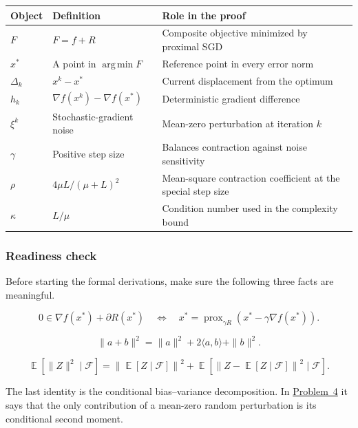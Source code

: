 \documentclass[11pt,a4paper]{article}
\DeclareMathOperator*{\argmin}{arg\,min}
\DeclareMathOperator{\E}{\mathbb{E}}
\DeclareMathOperator{\prox}{prox}
\newcommand{\jump}[2]{\hyperref[#1]{#2}}
\theoremstyle{definition}
\begin{document}
{\footnotesize
\setlength{\tabcolsep}{3pt}
\renewcommand{\arraystretch}{1.2}
\noindent
\begin{tabularx}{\linewidth}{|
  >{\raggedright\arraybackslash}p{2.55cm}|
  >{\raggedright\arraybackslash}X|
  >{\raggedright\arraybackslash}X|
}
\hline
\textbf{Object} & \textbf{Definition} & \textbf{Role in the proof} \\
\hline
$F$ & $F=f+R$ & Composite objective minimized by proximal SGD \\
\hline
$x^*$ & A point in $\argmin F$ & Reference point in every error norm \\
\hline
$\Delta_k$ & $x^k-x^*$ & Current displacement from the optimum \\
\hline
$h_k$ & $\nabla f(x^k)-\nabla f(x^*)$ & Deterministic gradient difference \\
\hline
$\xi^k$ & Stochastic-gradient noise & Mean-zero perturbation at iteration $k$ \\
\hline
$\gamma$ & Positive step size & Balances contraction against noise sensitivity \\
\hline
$\rho$ & $4\mu L/(\mu+L)^2$ & Mean-square contraction coefficient at the special step size \\
\hline
$\kappa$ & $L/\mu$ & Condition number used in the complexity bound \\
\hline
\end{tabularx}
\par}

\subsubsection{Readiness check}

Before starting the formal derivations, make sure the following three facts are meaningful.

\[
0\in\nabla f(x^*)+\partial R(x^*)
\quad\Longleftrightarrow\quad
x^*=\prox_{\gamma R}\left(x^*-\gamma\nabla f(x^*)\right).
\]

\[
\|a+b\|^2=\|a\|^2+2\langle a,b\rangle+\|b\|^2.
\]

\[
\E\left[\|Z\|^2\mid\mathcal{F}\right]
=\left\|\E\left[Z\mid\mathcal{F}\right]\right\|^2
+\E\left[\left\|Z-\E\left[Z\mid\mathcal{F}\right]\right\|^2\mid\mathcal{F}\right].
\]

The last identity is the conditional bias--variance decomposition. In \jump{prob:spr2025-opt-4}{Problem~4} it says that the only contribution of a mean-zero random perturbation is its conditional second moment.
\end{document}

